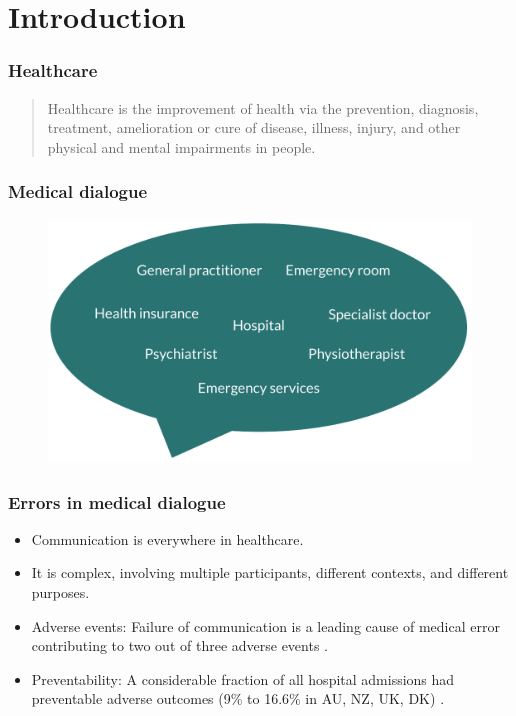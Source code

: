 
\section{Introduction}

\begin{frame}
    \frametitle{Healthcare}
    \begin{quotation}
        \noindent\centering
        Healthcare is the improvement of health via the {\color{dtured}prevention}, {\color{dtured}diagnosis}, {\color{dtured}treatment}, {\color{dtured}amelioration} or {\color{dtured}cure} of {\color{theme-green}disease}, {\color{theme-green}illness}, {\color{theme-green}injury}, and {\color{theme-green}other physical and mental impairments} in people.
    \end{quotation}
\end{frame}


\begin{frame}
    \frametitle{Medical dialogue}
    \begin{figure}
        \centering
        \includegraphics[width=0.7\paperwidth]{figures/speech_bubble.pdf}
    \end{figure}

\end{frame}


\begin{frame}
    \frametitle{Errors in medical dialogue}
    \begin{itemize}
        \item<1,2>Communication is everywhere in healthcare. 
        \item <1,2>It is complex, involving multiple participants, different contexts, and different purposes.
        \vspace{1em}
        \item <2> {\color{dtured} Adverse events}: Failure of communication is a leading cause of medical error contributing to two out of three adverse events \cite{starmer_changes_2014}.
        \item <2> {\color{dtured} Preventability}: A considerable fraction of all hospital admissions had preventable adverse outcomes (9\% to 16.6\% in AU, NZ, UK, DK) \cite{carver_medical_2024}.
    \end{itemize}
\end{frame}


